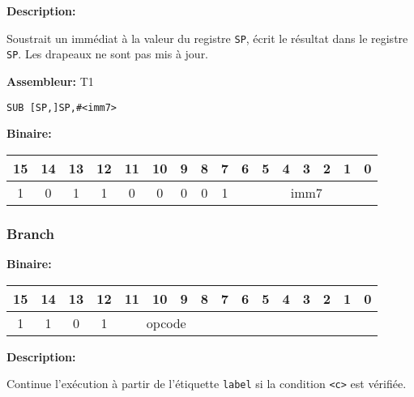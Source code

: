 \documentclass{article}
\begin{document}

    \textbf{Description: }

    Soustrait un immédiat à la valeur du registre \texttt{SP}, écrit le résultat dans le registre \texttt{SP}.
    Les drapeaux ne sont pas mis à jour.

    \textbf{Assembleur:} T1

    \begin{lstlisting}
SUB [SP,]SP,#<imm7>
    \end{lstlisting}



    \textbf{Binaire:}\\

    \begin{tabular}{| c c c c c c c c c c c c c c c c |}
        \hline
        15 & 14 & 13 & 12 & \multicolumn{1}{|c}{11} & 10 & 9 & 8 & \multicolumn{1}{|c}{7} & \multicolumn{1}{|c}{6} & 5 & 4 & 3 & 2 & 1 & 0 \\
        \hline
        1 & 0 & 1 & 1 & \multicolumn{1}{|c}{0} & 0 & 0 & 0 & \multicolumn{1}{|c}{1} & \multicolumn{7}{|c|}{imm7} \\
        \hline
    \end{tabular}

    \subsubsection{Branch}
    \label{subsubsec:Branching}

    \textbf{Binaire:}\\

    \begin{tabular}{| c c c c c c c c c c c c c c c c |}
        \hline
        15 & 14 & 13 & 12 & \multicolumn{1}{|c}{11} & 10 & 9 & 8 & \multicolumn{1}{|c}{7} & 6 & 5 & 4 & 3 & 2 & 1 & 0 \\
        \hline
        1 & 1 & 0 & 1 & \multicolumn{4}{|c}{opcode} & \multicolumn{8}{|c|}{} \\
        \hline
    \end{tabular}

    \label{subsubsubsec:CondBranch}

    \textbf{Description: }

    Continue l'exécution à partir de l'étiquette \texttt{label} si la condition \texttt{<c>} est vérifiée.\\
\end{document}
